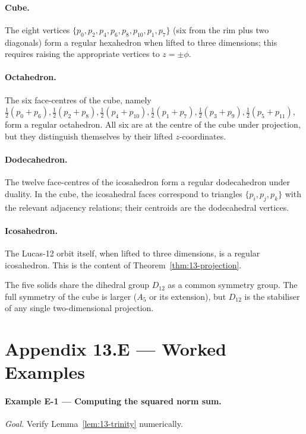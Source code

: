 \paragraph{Cube.}
The eight vertices $\{p_{0}, p_{2}, p_{4}, p_{6}, p_{8}, p_{10}, p_{1},
p_{7}\}$ (six from the rim plus two diagonals) form a regular
hexahedron when lifted to three dimensions; this requires raising
the appropriate vertices to $z = \pm \phi$.

\paragraph{Octahedron.}
The six face-centres of the cube, namely
$\frac{1}{2}(p_{0} + p_{6}), \frac{1}{2}(p_{2} + p_{8}),
\frac{1}{2}(p_{4} + p_{10}), \frac{1}{2}(p_{1} + p_{7}),
\frac{1}{2}(p_{3} + p_{9}), \frac{1}{2}(p_{5} + p_{11})$, form a
regular octahedron. All six are at the centre of the cube under
projection, but they distinguish themselves by their lifted
$z$-coordinates.

\paragraph{Dodecahedron.}
The twelve face-centres of the icosahedron form a regular
dodecahedron under duality. In the cube, the icosahedral faces
correspond to triangles $\{p_{i}, p_{j}, p_{k}\}$ with the relevant
adjacency relations; their centroids are the dodecahedral vertices.

\paragraph{Icosahedron.}
The Lucas-12 orbit itself, when lifted to three dimensions, is a
regular icosahedron. This is the content of
Theorem~\ref{thm:13-projection}.

The five solids share the dihedral group $D_{12}$ as a common
symmetry group. The full symmetry of the cube is larger ($A_{5}$
or its extension), but $D_{12}$ is the stabiliser of any single
two-dimensional projection.

\section*{Appendix 13.E --- Worked Examples}
\label{fa_13:sec:13-appE}

\paragraph{Example E-1 --- Computing the squared norm sum.}
\emph{Goal.} Verify Lemma~\ref{lem:13-trinity} numerically.

